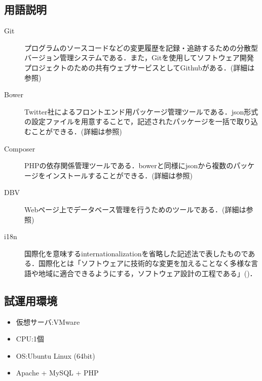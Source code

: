 \documentclass[a4paper]{jarticle}
\begin{document}
\begin{multicols}{2}
\subsection{用語説明}
\begin{description}
\item[Git]プログラムのソースコードなどの変更履歴を記録・追跡するための分散型バージョン管理システムである．また，Gitを使用してソフトウェア開発プロジェクトのための共有ウェブサービスとしてGithubがある．(詳細は\cite{git}参照)
\end{description}

\begin{description}
\item[Bower]Twitter社によるフロントエンド用パッケージ管理ツールである．json形式の設定ファイルを用意することで，記述されたパッケージを一括で取り込むことができる．(詳細は\cite{bower}参照)
\end{description}

\begin{description}
\item[Composer] PHPの依存関係管理ツールである．bowerと同様にjsonから複数のパッケージをインストールすることができる．(詳細は\cite{composer}参照)

\end{description}

\begin{description}
\item[DBV]  Webページ上でデータベース管理を行うためのツールである．(詳細は\cite{dbv}参照)
\end{description}

\begin{description}
\item[i18n] 国際化を意味するinternationalizationを省略した記述法で表したものである．国際化とは「ソフトウェアに技術的な変更を加えることなく多様な言語や地域に適合できるようにする，ソフトウェア設計の工程である」(\cite{i18n})．
\end{description}

\subsection{試運用環境}
\begin{itemize}
\item 仮想サーバ:VMware
\item CPU:1個
\item OS:Ubuntu Linux (64bit)
\item Apache + MySQL + PHP
\end{itemize}


\end{multicols}
\end{document}
